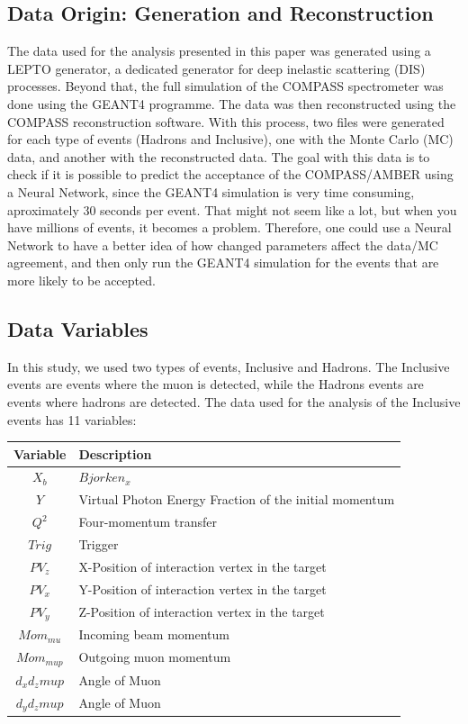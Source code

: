 \documentclass{article}
\begin{document}
\subsection{Data Origin: Generation and Reconstruction}
The data used for the analysis presented in this paper was generated using a LEPTO generator,
a dedicated generator for deep inelastic scattering (DIS) processes. Beyond that, the full simulation
of the COMPASS spectrometer was done using the GEANT4 programme. The data was then reconstructed
using the COMPASS reconstruction software. With this process, two files were generated for each type of events (Hadrons and Inclusive), one with the
Monte Carlo (MC) data, and another with the reconstructed data. 
The goal with this data is to check if it is possible to predict the acceptance of the COMPASS/AMBER
using a Neural Network, since the GEANT4 simulation is very time consuming, aproximately 30 seconds per event.
That might not seem like a lot, but when you have millions of events, it becomes a problem.
Therefore, one could use a Neural Network to have a better idea of how changed parameters affect the data/MC
agreement, and then only run the GEANT4 simulation for the events that are more likely to be accepted.


\subsection{Data Variables}
In this study, we used two types of events, Inclusive and Hadrons. The Inclusive events are events where the muon is detected, while the Hadrons events are events where hadrons are detected.
The data used for the analysis of the Inclusive events has 11 variables:

\begin{table}[H]
    \centering
    \begin{tabular}{c|l}
    \textbf{Variable} & \textbf{Description} \\ \hline
    $X_b$ & $Bjorken_x$ \\
    $Y$ & Virtual Photon Energy Fraction of the initial momentum\\
    $Q^2$ & Four-momentum transfer \\
    $Trig$ & Trigger \\
    $PV_z$ & X-Position of interaction vertex in the target\\
    $PV_x$ & Y-Position of interaction vertex in the target\\
    $PV_y$ & Z-Position of interaction vertex in the target\\
    $Mom_{mu}$ & Incoming beam momentum\\
    $Mom_{mup}$ & Outgoing muon momentum\\
    $d_xd_zmup$ & Angle of Muon \\
    $d_{y}d_{z}mup$ & Angle of Muon \\
    \end{tabular}
\end{table}
\end{document}
